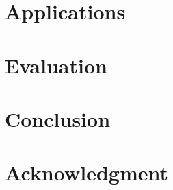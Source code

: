 \documentclass[conference]{IEEEtran}
\begin{document}
\section{Applications}
\label{applications}
\section{Evaluation}
\label{evaluations}
\section{Conclusion}
\label{conclusions}
\section*{Acknowledgment}



\suppressfloats
\end{document}
